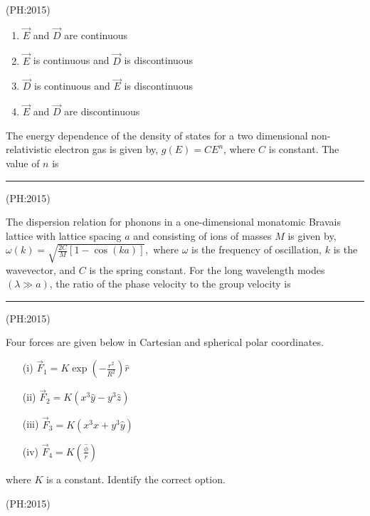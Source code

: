 		\hfill{(PH:2015)}
		\vspace{0.5cm}
	\begin{multicols}{2}
			\begin{enumerate}
				\item $\overrightarrow{E}$ and $\overrightarrow{D}$ are continuous
				\item $\overrightarrow{E}$ is continuous and $\overrightarrow{D}$ is discontinuous
				\item $\overrightarrow{D}$ is continuous and $\overrightarrow{E}$ is discontinuous
				\item $\overrightarrow{E}$ and $\overrightarrow{D}$ are discontinuous
			\end{enumerate}
		\end{multicols}
	\item 
		The energy dependence of the density of states for a two dimensional non-relativistic electron gas is given by, $g(E) = CE^n$, where $C$ is constant. The value of $n$ is \rule{2.5cm}{0.4pt}

		\hfill{(PH:2015)}
		\vspace{0.5cm}
	\item
		The dispersion relation for phonons in a one-dimensional monatomic Bravais lattice with lattice spacing $a$ and consisting of ions of masses $M$ is given by, $\omega(k) = \sqrt{\frac{2C}{M} \left[ 1 - \cos(ka) \right]},$ where $\omega$ is the frequency of oscillation, $k$ is the wavevector, and $C$ is the spring constant. For the long wavelength modes $(\lambda \gg a)$, the ratio of the phase velocity to the group velocity is \rule{2cm}{0.4pt}

		\hfill{(PH:2015)}
		\vspace{0.5cm}
	\item
		Four forces are given below in Cartesian and spherical polar coordinates.
\begin{itemize}
    \item[(i)] $\vec{F}_1 = K \exp\left(-\frac{r^2}{R^2}\right) \hat{r}$
    \item[(ii)] $\vec{F}_2 = K ( x^3 \hat{y} - y^3 \hat{z} )$
    \item[(iii)] $\vec{F}_3 = K ( x^3 \hat{x} + y^3 \hat{y} )$
    \item[(iv)] $\vec{F}_4 = K \left( \frac{\hat{\phi}}{r} \right)$
\end{itemize}

where $K$ is a constant. Identify the correct option.

\hfill{(PH:2015)}

